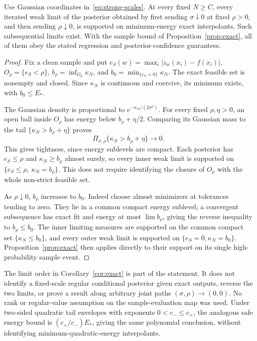 \documentclass[11pt]{article}
\theoremstyle{remark}\newtheorem{remark}[theorem]{Remark}
\begin{document}
\begin{corollary}\label{cor:exact}
Use Gaussian coordinates in~\eqref{eq:strong-scales}. At every fixed
$N\geq C$, every iterated weak limit of the posterior obtained by first
sending $\sigma\downarrow0$ at fixed $\rho>0$, and then sending
$\rho\downarrow0$, is supported on minimum-energy exact interpolants.
Such subsequential limits exist. With the sample bound of
Proposition~\ref{prop:exact}, all of them obey the stated regression and
posterior-confidence guarantees.
\end{corollary}
\begin{proof}
Fix a clean sample and put $e_S(w)=\max_i|z_w(x_i)-f(x_i)|$,
$O_\rho=\{e_S<\rho\}$,
$b_\rho=\inf_{O_\rho}\kappa_N$, and
$b_0=\min_{\{e_S=0\}}\kappa_N$.
The exact feasible set is nonempty and closed. Since $\kappa_N$ is
continuous and coercive, its minimum exists, with $b_0\leq E_*$.

The Gaussian density is proportional to
$e^{-\kappa_N/(2\sigma^2)}$. For every fixed $\rho,\eta>0$, an
open ball inside $O_\rho$ has energy below $b_\rho+\eta/2$.
Comparing its Gaussian mass to the tail
$\{\kappa_N>b_\rho+\eta\}$ proves
\[
 \Pi_{\sigma,\rho}\{\kappa_N>b_\rho+\eta\}\longrightarrow0.
\]
This gives tightness, since energy sublevels are compact. Each posterior
has $e_S\leq\rho$ and $\kappa_N\geq b_\rho$ almost surely, so every
inner weak limit is supported on
$\{e_S\leq\rho,\ \kappa_N=b_\rho\}$.
This does not require identifying the closure of $O_\rho$ with the
whole non-strict feasible set.

As $\rho\downarrow0$, $b_\rho$ increases to $b_0$. Indeed choose
almost minimizers at tolerances tending to zero. They lie in a common
compact energy sublevel; a convergent subsequence has exact fit and
energy at most $\lim b_\rho$, giving the reverse inequality to
$b_\rho\leq b_0$.
The inner limiting measures are supported on the common compact set
$\{\kappa_N\leq b_0\}$, and every outer weak limit is supported on
$\{e_S=0,\kappa_N=b_0\}$. Proposition~\ref{prop:exact} then applies
directly to their support on its single high-probability sample event.
\end{proof}

The limit order in Corollary~\ref{cor:exact} is part of the statement.
It does not identify a fixed-scale regular conditional posterior given
exact outputs, reverse the two limits, or prove a result along arbitrary
joint paths $(\sigma,\rho)\to(0,0)$. No rank or regular-value assumption
on the sample-evaluation map was used. Under two-sided quadratic
tail envelopes with exponents $0<c_-\leq c_+$, the analogous safe energy
bound is $(c_+/c_-)E_*$, giving the same polynomial conclusion, without
identifying minimum-quadratic-energy interpolants.
\end{document}
